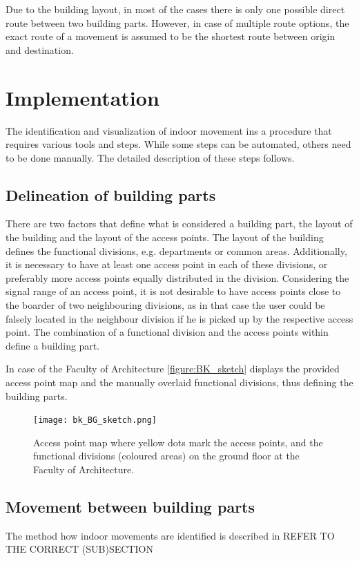 Due to the building layout, in most of the cases there is only one possible
direct route between two building parts. However, in case of multiple route
options, the exact route of a movement is assumed to be the shortest route 
between origin and
destination.

\section{Implementation}
The identification and visualization of indoor movement ins a procedure that
requires various tools and steps. While some steps can be automated, others need
to be done manually. The detailed description of these steps follows.

\subsection{Delineation of building parts}
There are two factors that define what is considered a building part, the layout
of the building and the layout of the access points. The layout of the
building defines the functional divisions, e.g. departments or common areas.
Additionally, it is necessary to have at least one access point in each of these
divisions, or preferably more access points equally distributed in the division.
Considering the signal range of an access point, it is not desirable to have
access points close to the boarder of two neighbouring divisions, as in that
case the user could be falsely located in the neighbour division if he is picked
up by the respective access point. The combination of a functional division and
the access points within define a building part.

In case of the Faculty of Architecture \autoref{figure:BK_sketch} displays the
provided access point map and the manually overlaid functional divisions, thus
defining the building parts.

\begin{figure}[H]
\centering
\texttt{[image: bk\_BG\_sketch.png]}
\captionsetup{justification=centering}
\caption{Access point map where yellow dots mark the access points, and
the functional divisions (coloured areas) on the ground floor at the Faculty of
Architecture.}
\label{figure:BK_sketch}
\end{figure}

\subsection{Movement between building parts}
The method how indoor movements are identified is described in REFER TO THE
CORRECT (SUB)SECTION

